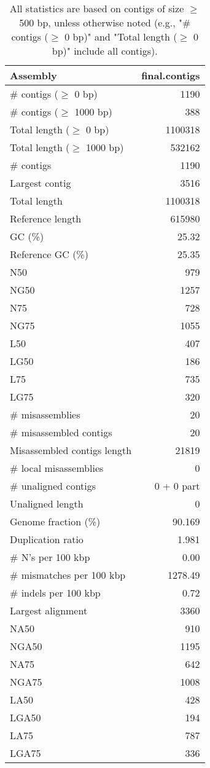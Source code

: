 \documentclass[12pt,a4paper]{article}
\begin{document}
\begin{table}[ht]
\begin{center}
\caption{All statistics are based on contigs of size $\geq$ 500 bp, unless otherwise noted (e.g., "\# contigs ($\geq$ 0 bp)" and "Total length ($\geq$ 0 bp)" include all contigs).}
\begin{tabular}{|l*{1}{|r}|}
\hline
Assembly & final.contigs \\ \hline
\# contigs ($\geq$ 0 bp) & 1190 \\ \hline
\# contigs ($\geq$ 1000 bp) & 388 \\ \hline
Total length ($\geq$ 0 bp) & 1100318 \\ \hline
Total length ($\geq$ 1000 bp) & 532162 \\ \hline
\# contigs & 1190 \\ \hline
Largest contig & 3516 \\ \hline
Total length & 1100318 \\ \hline
Reference length & 615980 \\ \hline
GC (\%) & 25.32 \\ \hline
Reference GC (\%) & 25.35 \\ \hline
N50 & 979 \\ \hline
NG50 & 1257 \\ \hline
N75 & 728 \\ \hline
NG75 & 1055 \\ \hline
L50 & 407 \\ \hline
LG50 & 186 \\ \hline
L75 & 735 \\ \hline
LG75 & 320 \\ \hline
\# misassemblies & 20 \\ \hline
\# misassembled contigs & 20 \\ \hline
Misassembled contigs length & 21819 \\ \hline
\# local misassemblies & 0 \\ \hline
\# unaligned contigs & 0 + 0 part \\ \hline
Unaligned length & 0 \\ \hline
Genome fraction (\%) & 90.169 \\ \hline
Duplication ratio & 1.981 \\ \hline
\# N's per 100 kbp & 0.00 \\ \hline
\# mismatches per 100 kbp & 1278.49 \\ \hline
\# indels per 100 kbp & 0.72 \\ \hline
Largest alignment & 3360 \\ \hline
NA50 & 910 \\ \hline
NGA50 & 1195 \\ \hline
NA75 & 642 \\ \hline
NGA75 & 1008 \\ \hline
LA50 & 428 \\ \hline
LGA50 & 194 \\ \hline
LA75 & 787 \\ \hline
LGA75 & 336 \\ \hline
\end{tabular}
\end{center}
\end{table}
\end{document}
